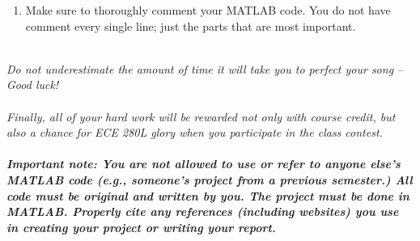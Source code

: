 \documentclass[12pt]{article}
\begin{document}
\begin{enumerate}
    \item Make sure to thoroughly comment your MATLAB code. You do not have comment every single line; just the parts that are most important. 
    
    
\end{enumerate}
~\\
\textit{Do not underestimate the amount of time it will take you to perfect your song – Good luck!}
~\\~\\
\noindent
\textit{Finally, all of your hard work will be rewarded not only with course credit, but also a chance for ECE 280L glory when you participate in the class contest. }
~\\~\\
\noindent
\textbf{\textit{Important note: You are not allowed to use or refer to anyone else’s MATLAB code (e.g., someone’s project from a previous semester.) All code must be original and written by you. The project must be done in MATLAB. Properly cite any references (including websites) you use in creating your project or writing your report.}}
\end{document}

